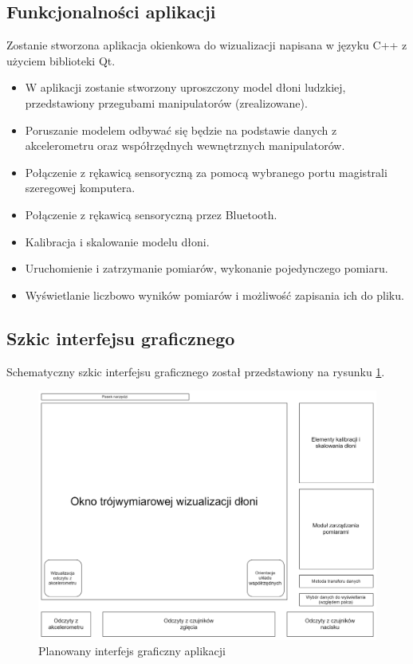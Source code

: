 \documentclass[12pt,a4paper]{article}
\begin{document}
\subsection{Funkcjonalności aplikacji}
Zostanie stworzona aplikacja okienkowa do wizualizacji napisana w języku C++ z użyciem biblioteki Qt.\\
\begin{itemize}
\item W aplikacji zostanie stworzony uproszczony model dłoni ludzkiej, przedstawiony przegubami manipulatorów (zrealizowane).
\item Poruszanie modelem odbywać się będzie na podstawie danych z akcelerometru oraz współrzędnych wewnętrznych manipulatorów.
\item Połączenie z rękawicą sensoryczną za pomocą wybranego portu magistrali szeregowej komputera.
\item Połączenie z rękawicą sensoryczną przez Bluetooth.
\item Kalibracja i skalowanie modelu dłoni.
\item Uruchomienie i zatrzymanie pomiarów, wykonanie pojedynczego pomiaru.
\item Wyświetlanie liczbowo wyników pomiarów i możliwość zapisania ich do pliku.
\end{itemize}
\subsection{Szkic interfejsu graficznego}
Schematyczny szkic interfejsu graficznego został przedstawiony na rysunku \ref{fig:interface}.
\begin{figure}[!htb]
\centering
\includegraphics[width=\textwidth]{./WDS_schemat_ideowy_okna_programu.png}
\caption{Planowany interfejs graficzny aplikacji\label{fig:interface}}
\end{figure}
\end{document}
